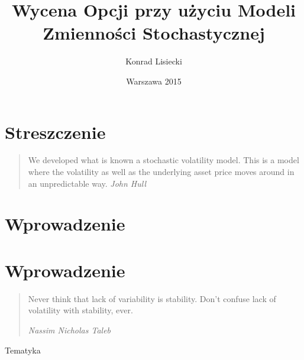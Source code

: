 \documentclass{pracamgr}
\author{Konrad Lisiecki}
\title{Wycena Opcji przy użyciu Modeli Zmienności Stochastycznej}
\date{Warszawa 2015}
\begin{document}
\maketitle
\nocite{book-full} 

\chapter*{Streszczenie} 

\begin{quote}
We developed what is known a stochastic volatility model. This is a model where the volatility as well as the underlying asset price moves around in an unpredictable way.
\raggedleft\slshape John Hull 
\end{quote}



\tableofcontents
 

 


\chapter{Wprowadzenie}
\label{chap:introduction}

\chapter{Wprowadzenie}
\label{chap:introduction}

\begin{quote}

Never think that lack of variability is stability. Don't confuse lack of volatility with stability, ever.
 
\raggedleft\slshape Nassim Nicholas Taleb 
\end{quote}
 

Tematyka 
\end{document}
